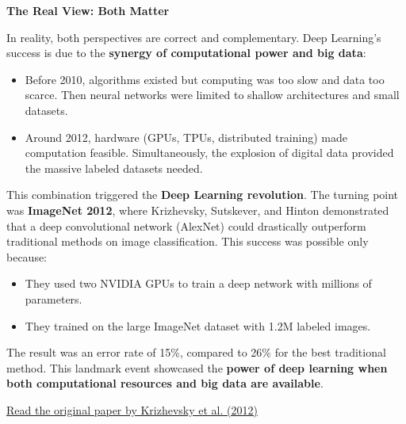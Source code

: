 \highspace
\begin{flushleft}
    \textcolor{Green3}{ \textbf{The Real View: Both Matter}}\label{real-view}
\end{flushleft}
In reality, both perspectives are correct and complementary. Deep Learning's success is due to the \textbf{synergy of computational power and big data}:
\begin{itemize}
    \item Before 2010, algorithms existed but computing was too slow and data too scarce. Then neural networks were limited to shallow architectures and small datasets.
    \item Around 2012, hardware (GPUs, TPUs, distributed training) made computation feasible. Simultaneously, the explosion of digital data provided the massive labeled datasets needed.
\end{itemize}
This combination triggered the \textbf{Deep Learning revolution}. The turning point was \textbf{ImageNet 2012}, where Krizhevsky, Sutskever, and Hinton demonstrated that a deep convolutional network (AlexNet) could drastically outperform traditional methods on image classification. \cite{krizhevsky2012imagenet} This success was possible only because:
\begin{itemize}
    \item They used two NVIDIA GPUs to train a deep network with millions of parameters.
    \item They trained on the large ImageNet dataset with 1.2M labeled images.
\end{itemize}
The result was an error rate of 15\%, compared to 26\% for the best traditional method. This landmark event showcased the \textbf{power of deep learning when both computational resources and big data are available}.
\begin{center}
    \href{https://proceedings.neurips.cc/paper/2012/file/c399862d3b9d6b76c8436e924a68c45b-Paper.pdf}{ Read the original paper by Krizhevsky et al. (2012)}
    \hspace{1cm}
\end{center}